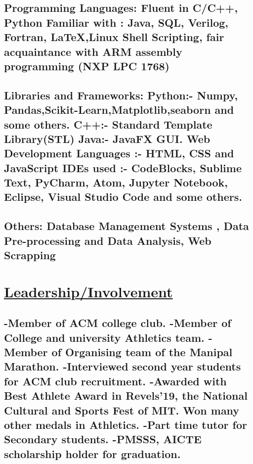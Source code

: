 \documentclass{article}
\begin{document}
    \subsection{\textbf{Programming Languages:}
    \textmd{Fluent in C/C++, Python }\newline
    \textmd{Familiar with : Java, SQL, Verilog, Fortran, {\LaTeX},Linux Shell Scripting, fair acquaintance
    with ARM assembly programming (NXP LPC 1768) } }

    \subsection{\textbf{Libraries and Frameworks:}\newline
    \textbf{Python:}\textmd{- Numpy, Pandas,Scikit-Learn,Matplotlib,seaborn and some others.}\newline
    \textbf{C++:}\textmd{- Standard Template Library(STL)}\newline
    \textbf{Java:}\textmd{- JavaFX GUI.}\newline
    \textbf{Web Development Languages :}\textmd{- HTML, CSS and JavaScript}\newline
    \textbf{IDEs used :}\textmd{- CodeBlocks, Sublime Text, PyCharm, Atom, Jupyter Notebook, Eclipse, Visual Studio Code and some others.}}

    \subsection{\textbf{Others:}
    \textmd{Database Management Systems , Data Pre-processing and Data Analysis, Web Scrapping}}




\section{\underline{Leadership/Involvement}}
    \subsection{\textmd{-Member of ACM college club. }\newline
    \textmd{-Member of College and university Athletics team. }\newline
    \textmd{-Member of Organising team of the Manipal Marathon. }\newline
    \textmd{-Interviewed second year students for ACM club recruitment. }\newline
    \textmd{-Awarded with Best Athlete Award in Revels'19, the National Cultural and Sports Fest of MIT. Won many other medals in Athletics. }\newline
    \textmd{-Part time tutor for Secondary students. }\newline
    \textmd{-PMSSS, AICTE scholarship holder for graduation.}}



\end{document}
